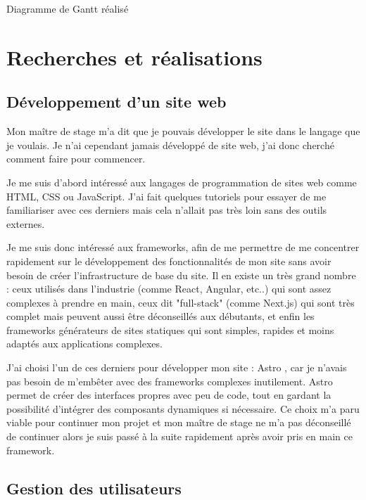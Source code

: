 \begin{table}[H]
\centering
    
\caption{Diagramme de Gantt réalisé}
\label{tab:diag de Gantt}
\end{table}


\newpage
\chapter{Recherches et réalisations}

\section{Développement d'un site web}

Mon maître de stage m'a dit que je pouvais développer le site dans le langage que je voulais. Je n'ai cependant jamais développé de site web, j'ai donc cherché comment faire pour commencer.

Je me suis d'abord intéressé aux langages de programmation de sites web comme HTML, CSS ou JavaScript. J'ai fait quelques tutoriels pour essayer de me familiariser avec ces derniers mais cela n'allait pas très loin sans des outils externes.

Je me suis donc intéressé aux frameworks, afin de me permettre de me concentrer rapidement sur le développement des fonctionnalités de mon site sans avoir besoin de créer l'infrastructure de base du site. Il en existe un très grand nombre : ceux utilisés dans l'industrie (comme React, Angular, etc..) qui sont assez complexes à prendre en main, ceux dit "full-stack" (comme Next.js) qui sont très complet mais peuvent aussi être déconseillés aux débutants, et enfin les frameworks générateurs de sites statiques qui sont simples, rapides et moins adaptés aux applications complexes. 

J'ai choisi l'un de ces derniers pour développer mon site : Astro \cite{astro}, car je n'avais pas besoin de m'embêter avec des frameworks complexes inutilement. Astro permet de créer des interfaces propres avec peu de code, tout en gardant la possibilité d’intégrer des composants dynamiques si nécessaire. Ce choix m'a paru viable pour continuer mon projet et mon maître de stage ne m'a pas déconseillé de continuer alors je suis passé à la suite rapidement après avoir pris en main ce framework.

\newpage
\section{Gestion des utilisateurs}


